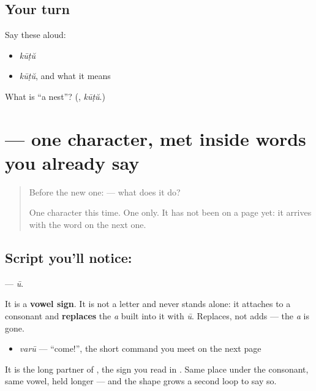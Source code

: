 \subsection*{Your turn}
Say these aloud:

\begin{itemize}
\raggedright
  \item \emph{kūṭŭ}
  \item \emph{kūṭŭ}, and what it means
\end{itemize}

\begin{tcolorbox}[breakable,colback=teal!4,colframe=teal!35!black,title={Before you move on}]
What is \textquotedblleft{}a nest\textquotedblright{}? (\textbf{}, \emph{kūṭŭ}.)
\end{tcolorbox}
\section[\texorpdfstring{\ml{ൂ} (ū)}{ൂ (ū)}]{ — one character, met inside words you already say}

\label{lesson:ML-S141-vowel-sign-uu}



\begin{quote}
Before the new one:  — what does it do?

One character this time. One only. It has not been on a page yet: it arrives with the word on the next one.
\end{quote}

\subsection*{Script you'll notice: }
\textbf{} — \emph{ū}.

It is a \textbf{vowel sign}. It is not a letter and never stands alone: it attaches to a consonant and \textbf{replaces} the \emph{a} built into it with \emph{ū}. Replaces, not adds — the \emph{a} is gone.

\begin{itemize}
\raggedright
  \item \textbf{} \emph{varū} — \textquotedblleft{}come!\textquotedblright{}, the short command you meet on the next page
\end{itemize}

It is the long partner of \textbf{}, the sign you read in \textbf{}. Same place under the consonant, same vowel, held longer — and the shape grows a second loop to say so.

